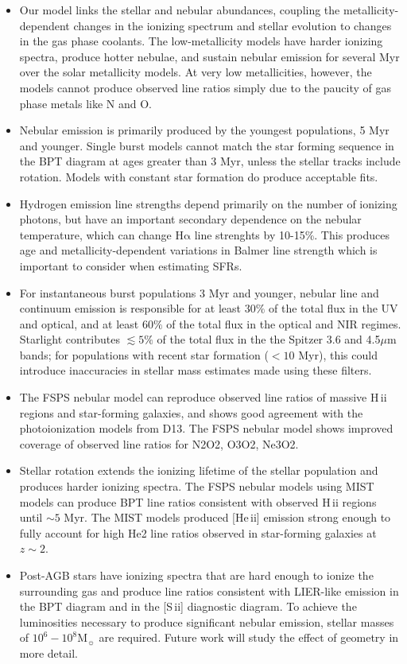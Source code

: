 \documentclass[linenumbers, trackchanges, tighten]{aastex61}%
\newcommand{\FSPS}{{\sc FSPS}\xspace}
\newcommand{\sii}{[S\,{\sc ii}]\xspace}
\newcommand{\heii}{[He\,{\sc ii}]\xspace}
\newcommand\Msun{\ensuremath{\mathrm{M_{\sun}}}}
\newcommand{\ha}{\ensuremath{\mathrm{H\alpha}}}
\newcommand{\hii}{H\,{\sc ii}\xspace}
\begin{document}
\begin{itemize}
\item Our model links the stellar and nebular abundances, coupling the metallicity-dependent changes in the ionizing spectrum and stellar evolution to changes in the gas phase coolants. The low-metallicity models have harder ionizing spectra, produce hotter nebulae, and sustain nebular emission for several Myr over the solar metallicity models. At very low metallicities, however, the models cannot produce observed line ratios simply due to the paucity of gas phase metals like N and O.
\item Nebular emission is primarily produced by the youngest populations, 5 Myr and younger. Single burst models cannot match the star forming sequence in the BPT diagram at ages greater than 3 Myr, unless the stellar tracks include rotation. Models with constant star formation do produce acceptable fits.
\item Hydrogen emission line strengths depend primarily on the number of ionizing photons, but have an important secondary dependence on the nebular temperature, which can change \ha{} line strenghts by 10-15\%. This produces age and metallicity-dependent variations in Balmer line strength which is important to consider when estimating SFRs.
\item For instantaneous burst populations 3 Myr and younger, nebular line and continuum emission is responsible for at least $30\%$ of the total flux in the UV and optical, and at least $60\%$ of the total flux in the optical and NIR regimes. Starlight contributes $\lesssim5\%$ of the total flux in the the Spitzer 3.6 and 4.5$\mu$m bands; for populations with recent star formation ($<10$ Myr), this could introduce inaccuracies in stellar mass estimates made using these filters.
\item The \FSPS nebular model can reproduce observed line ratios of massive \hii regions and star-forming galaxies, and shows good agreement with the photoionization models from D13. The FSPS nebular model shows improved coverage of observed line ratios for N2O2, O3O2, Ne3O2.
\item Stellar rotation extends the ionizing lifetime of the stellar population and produces harder ionizing spectra. The \FSPS nebular models using MIST models can produce BPT line ratios consistent with observed \hii regions until ${\sim}5$ Myr. The MIST models produced \heii emission strong enough to fully account for high He2 line ratios observed in star-forming galaxies at $z{\sim}2$.
\item Post-AGB stars have ionizing spectra that are hard enough to ionize the surrounding gas and produce line ratios consistent with LIER-like emission in the BPT diagram and in the \sii{} diagnostic diagram. To achieve the luminosities necessary to produce significant nebular emission, stellar masses of $10^6-10^8\Msun$ are required. Future work will study the effect of geometry in more detail.
\end{itemize}
\end{document}

